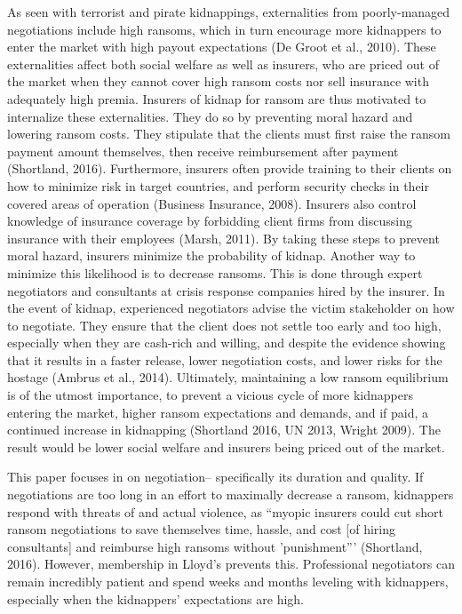 \documentclass[12pt]{article}
\begin{document}
As seen with terrorist and pirate kidnappings, externalities from poorly-managed negotiations include high ransoms, which in turn encourage more kidnappers to enter the market with high payout expectations (De Groot et al., 2010). These externalities affect both social welfare as well as insurers, who are priced out of the market when they cannot cover high ransom costs nor sell insurance with adequately high premia. Insurers of kidnap for ransom are thus motivated to internalize these externalities. They do so by preventing moral hazard and lowering ransom costs. They stipulate that the clients must first raise the ransom payment amount themselves, then receive reimbursement after payment (Shortland, 2016). Furthermore, insurers often provide training to their clients on how to minimize risk in target countries, and perform security checks in their covered areas of operation (Business Insurance, 2008). Insurers also control knowledge of insurance coverage by forbidding client firms from discussing insurance with their employees (Marsh, 2011). By taking these steps to prevent moral hazard, insurers minimize the probability of kidnap. Another way to minimize this likelihood is to decrease ransoms. This is done through expert negotiators and consultants at crisis response companies hired by the insurer. In the event of kidnap, experienced negotiators advise the victim stakeholder on how to negotiate. They ensure that the client does not settle too early and too high, especially when they are cash-rich and willing, and despite the evidence showing that it results in a faster release, lower negotiation costs, and lower risks for the hostage (Ambrus et al., 2014). Ultimately, maintaining a low ransom equilibrium is of the utmost importance, to prevent a vicious cycle of more kidnappers entering the market, higher ransom expectations and demands, and if paid, a continued increase in kidnapping (Shortland 2016, UN 2013, Wright 2009). The result would be lower social welfare and insurers being priced out of the market. 

This paper focuses in on negotiation-- specifically its duration and quality. If negotiations are too long in an effort to maximally decrease a ransom, kidnappers respond with threats of and actual violence, as ``myopic insurers could cut short ransom negotiations to save themselves time, hassle, and cost [of hiring consultants] and reimburse high ransoms without 'punishment''' (Shortland, 2016). However, membership in Lloyd's prevents this. Professional negotiators can remain incredibly patient and spend weeks and months leveling with kidnappers, especially when the kidnappers' expectations are high. 
\end{document}
